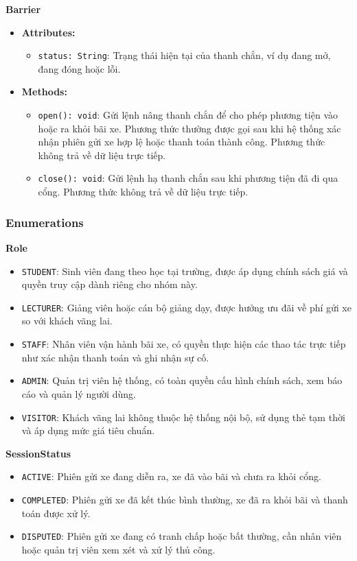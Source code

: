 \noindent\textbf{Barrier}
\begin{itemize}
	\item \textbf{Attributes:}
	\begin{itemize}
		\item \texttt{status: String}: Trạng thái hiện tại của thanh chắn, ví dụ đang mở, đang đóng hoặc lỗi.
	\end{itemize}
	\item \textbf{Methods:}
	\begin{itemize}
		\item \texttt{open(): void}: Gửi lệnh nâng thanh chắn để cho phép phương tiện vào hoặc ra khỏi bãi xe. Phương thức thường được gọi sau khi hệ thống xác nhận phiên gửi xe hợp lệ hoặc thanh toán thành công. Phương thức không trả về dữ liệu trực tiếp.
		\item \texttt{close(): void}: Gửi lệnh hạ thanh chắn sau khi phương tiện đã đi qua cổng. Phương thức không trả về dữ liệu trực tiếp.
	\end{itemize}
\end{itemize}

\subsubsection{Enumerations}

\noindent\textbf{Role}
\begin{itemize}
	\item \texttt{STUDENT}: Sinh viên đang theo học tại trường, được áp dụng chính sách giá và quyền truy cập dành riêng cho nhóm này.
	\item \texttt{LECTURER}: Giảng viên hoặc cán bộ giảng dạy, được hưởng ưu đãi về phí gửi xe so với khách vãng lai.
	\item \texttt{STAFF}: Nhân viên vận hành bãi xe, có quyền thực hiện các thao tác trực tiếp như xác nhận thanh toán và ghi nhận sự cố.
	\item \texttt{ADMIN}: Quản trị viên hệ thống, có toàn quyền cấu hình chính sách, xem báo cáo và quản lý người dùng.
	\item \texttt{VISITOR}: Khách vãng lai không thuộc hệ thống nội bộ, sử dụng thẻ tạm thời và áp dụng mức giá tiêu chuẩn.
\end{itemize}

\noindent\textbf{SessionStatus}
\begin{itemize}
	\item \texttt{ACTIVE}: Phiên gửi xe đang diễn ra, xe đã vào bãi và chưa ra khỏi cổng.
	\item \texttt{COMPLETED}: Phiên gửi xe đã kết thúc bình thường, xe đã ra khỏi bãi và thanh toán được xử lý.
	\item \texttt{DISPUTED}: Phiên gửi xe đang có tranh chấp hoặc bất thường, cần nhân viên hoặc quản trị viên xem xét và xử lý thủ công.
\end{itemize}


